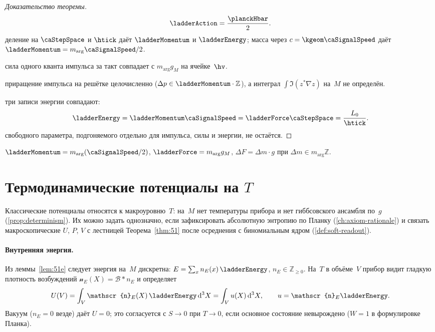\begin{proof}[Доказательство теоремы]
\[
  \ladderAction=\frac{\planckHbar}{2}.
\]
деление на $\caStepSpace$ и $\htick$ даёт $\ladderMomentum$ и $\ladderEnergy$;
масса через $c=\kgeom \caSignalSpeed$ даёт $\ladderMomentum=m_{\arg} \caSignalSpeed/2$.

сила одного кванта импульса за такт совпадает с $m_{\arg} g_M$ на ячейке~$\hv$.

приращение импульса на решётке целочисленно ($\Delta p\in\ladderMomentum\cdot\mathbb{Z}$),
а интеграл $\int\Im(z^*\nabla z)$ на~$M$ не определён.

три записи энергии совпадают:
\[
  \ladderEnergy=\ladderMomentum \caSignalSpeed=\ladderForce\caStepSpace=\frac{L_0}{\htick}.
\]
\phence свободного параметра, подгоняемого отдельно для импульса, силы и энергии, не остаётся.
\end{proof}

\begin{corollary}
$\ladderMomentum=m_{\arg}(\caSignalSpeed/2)$, $\ladderForce=m_{\arg} g_M$, $\Delta F=\Delta m\cdot g$ при $\Delta m\in m_{\arg}\mathbb{Z}$.
\end{corollary}

\section{Термодинамические потенциалы на \texorpdfstring{$T$}{T}}
\label{sec:thermo-potentials}

Классические потенциалы относятся к макроуровню~$T$: на~$M$ нет температуры прибора
и нет гиббсовского ансамбля по~$g$ (\cref{prop:determinism}).
Их можно задать однозначно, если зафиксировать абсолютную энтропию по Планку
(\cref{ch:axiom-rationale}) и связать макроскопические $U$, $P$, $V$ с лестницей
Теорема~\ref{thm:51} после осреднения с биномиальным ядром (\cref{def:soft-readout}).

\paragraph{Внутренняя энергия.}
Из леммы~\ref{lem:51e} следует энергия на~$M$ дискретна: $E=\sum_x n_E(x)\,\ladderEnergy$,
$n_E\in\mathbb{Z}_{\ge 0}$.
На~$T$ в объёме~$V$ прибор видит гладкую плотность возбуждений
$\mathscr{n}_E(X)=\mathcal{B}*n_E$ и определяет
\begin{equation}
\label{eq:internal-energy}
  U(V)=\int_V \mathscr{n}_E(X)\,\ladderEnergy\,\mathrm{d}^3X
  = \int_V u(X)\,\mathrm{d}^3X,
  \qquad u=\mathscr{n}_E \ladderEnergy.
\end{equation}
Вакуум ($n_E=0$ везде) даёт $U=0$; это согласуется с $S\to 0$ при $T\to 0$,
если основное состояние невырождено ($W=1$ в формулировке Планка).

